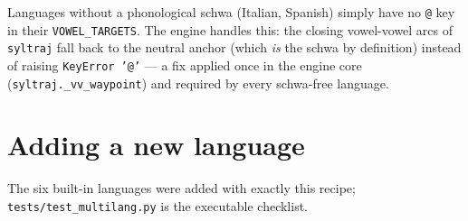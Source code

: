 \documentclass[11pt,a4paper]{article}
\newcommand{\code}[1]{\texttt{#1}}
\newcommand{\sampkey}[1]{\texttt{#1}}
\begin{document}
Languages without a phonological schwa (Italian, Spanish) simply have
no \sampkey{@} key in their \code{VOWEL\_TARGETS}. The engine handles
this: the closing vowel-vowel arcs of \code{syltraj} fall back to the
neutral anchor (which \emph{is} the schwa by definition) instead of
raising \code{KeyError '@'} --- a fix applied once in the engine core
(\code{syltraj.\_vv\_waypoint}) and required by every schwa-free
language.

\section{Adding a new language}
\label{sec:newlang}

The six built-in languages were added with exactly this recipe;
\code{tests/test\_multilang.py} is the executable checklist.
\end{document}
